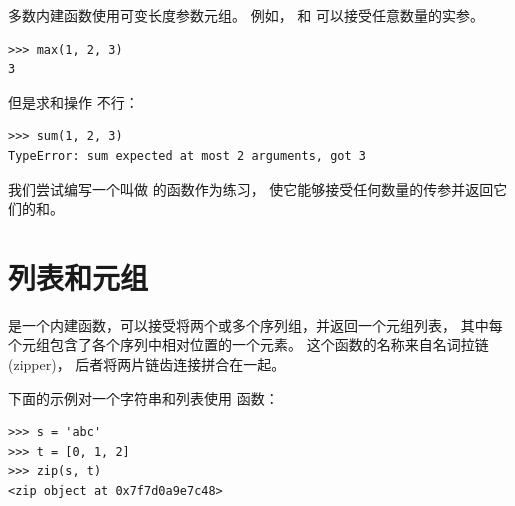 {多数内建函数使用可变长度参数元组。  
例如，  和   可以接受任意数量的实参。

 
 

\begin{lstlisting}
>>> max(1, 2, 3)
3
\end{lstlisting}

%

但是求和操作  不行：
 

\begin{lstlisting}
>>> sum(1, 2, 3)
TypeError: sum expected at most 2 arguments, got 3
\end{lstlisting}

%

我们尝试编写一个叫做  的函数作为练习， 
使它能够接受任何数量的传参并返回它们的和。


\section{列表和元组}
 


  是一个内建函数，可以接受将两个或多个序列组，并返回一个元组列表，
其中每个元组包含了各个序列中相对位置的一个元素。  
这个函数的名称来自名词拉链 (zipper)， 后者将两片链齿连接拼合在一起。



下面的示例对一个字符串和列表使用  函数：

\begin{lstlisting}
>>> s = 'abc'
>>> t = [0, 1, 2]
>>> zip(s, t)
<zip object at 0x7f7d0a9e7c48>
\end{lstlisting}

%

}
